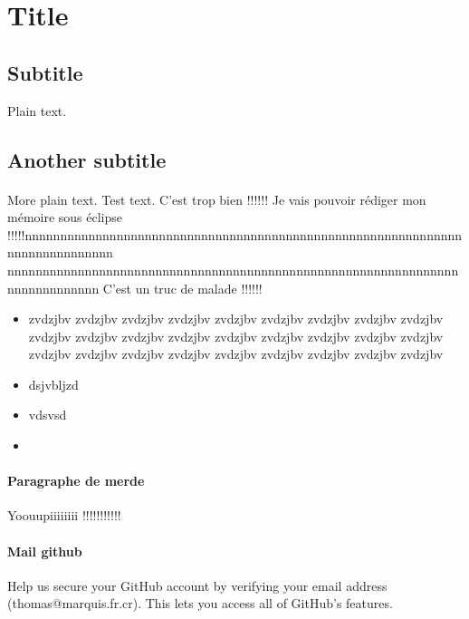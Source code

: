 \documentclass[a4paper, 12pt]{article}
\begin{document}
\section{Title}

\subsection{Subtitle}

Plain text.

\subsection{Another subtitle}
\paragraph{}
More plain text. Test text.
C'est trop bien !!!!!!  Je vais pouvoir rédiger mon mémoire sous éclipse
!!!!!nnnnnnnnnnnnnnnnnnnnnnnnnnnnnnnnnnnnnnnnnnnnnnnnnnnnnnnnnnnnnnnnnnnnnnnnnnnnn
nnnnnnnnnnnnnnnnnnnnnnnnnnnnnnnnnnnnnnnnnnnnnnnnnnnnnnnnnnnnnnnnnnnnnnnnnnnnn C'est un truc de malade !!!!!!

\begin{itemize}
  \item zvdzjbv zvdzjbv zvdzjbv zvdzjbv zvdzjbv zvdzjbv zvdzjbv zvdzjbv zvdzjbv
  zvdzjbv zvdzjbv zvdzjbv zvdzjbv zvdzjbv zvdzjbv zvdzjbv zvdzjbv zvdzjbv
  zvdzjbv zvdzjbv zvdzjbv zvdzjbv zvdzjbv zvdzjbv zvdzjbv zvdzjbv zvdzjbv 
  \item dsjvbljzd
  \item vdsvsd
  
  
  \item 
\end{itemize}

\paragraph{Paragraphe de merde}
Yoouupiiiiiiii !!!!!!!!!!!

\paragraph{Mail github}
Help us secure your GitHub account by verifying your email address
(thomas@marquis.fr.cr). This lets you access all of GitHub's features.
\end{document}

